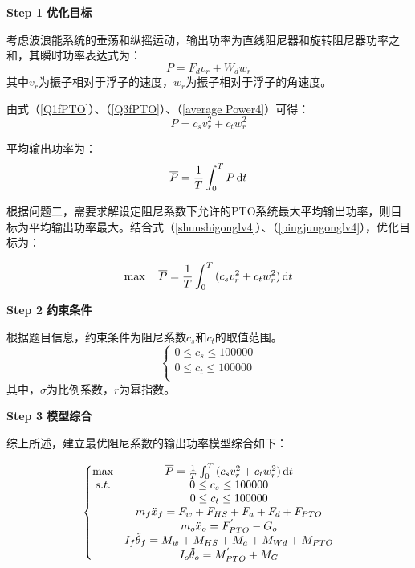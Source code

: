 \documentclass{my_paper}
\begin{document}
\textbf{Step 1 优化目标}

考虑波浪能系统的垂荡和纵摇运动，输出功率为直线阻尼器和旋转阻尼器功率之和，其瞬时功率表达式为\cite{唐友刚2016筏式波浪能发电装置浮体水动力相互作用与能量俘获研究}：
\begin{equation}
    P=F_{d} v_{r} + W_{d} w_{r}\label{average Power4}
\end{equation}
其中$v_{r} $为振子相对于浮子的速度，$w_{r} $为振子相对于浮子的角速度。

由式（\ref{Q1fPTO}）、（\ref{Q3fPTO}）、（\ref{average Power4}）可得：
\begin{equation}
    P=c_{s} v_{r}^2 + c_{t} w_{r}^2 \label{shunshigonglv4}
\end{equation}

平均输出功率为：
\begin{equation}
    \overline{P}=\frac{1}{T}\int_{0}^{T}{P}\,{\rm d}t\label{pingjungonglv4}
\end{equation}

根据问题二，需要求解设定阻尼系数下允许的PTO系统最大平均输出功率，则目标为平均输出功率最大。结合式（\ref{shunshigonglv4}）、（\ref{pingjungonglv4}），优化目标为：

$$
\max \quad \overline{P}=\frac{1}{T}\int_{0}^{T}{(c_{s} v_{r}^2 + c_{t} w_{r}^2)}\,{\rm d}t
$$

\textbf{Step 2 约束条件}

根据题目信息，约束条件为阻尼系数$c_s$和$c_t$的取值范围。
        \begin{equation}
            \left\{\begin{matrix}
            0\leq c_{s}\leq 100000 \\
            0\leq c_{t}\leq 100000 \\
            
            \end{matrix}\right.
        \end{equation}
        其中，$\sigma$为比例系数，$r$为幂指数。
    

\textbf{Step 3 模型综合}

综上所述，建立最优阻尼系数的输出功率模型综合如下：

\begin{equation}
    \left\{\begin{matrix}
        \max & \overline{P}=\frac{1}{T}\int_{0}^{T}{(c_{s} v_{r}^2 + c_{t} w_{r}^2)}\,{\rm d}t\\
        s.t. & 0 \leq c_s\leq 100000 \\
            & 0 \leq c_t\leq 100000 \\
            &  m_f \ddot x_f = F_w+F_{HS}+F_a+F_d+F_{PTO}\\
            &  m_o\ddot x_o = F_{PTO}^{'}-G_o\\
            & I_{f} \ddot \theta_{f} = M_w+M_{HS}+M_a+M_{Wd}+M_{PTO}\\
            & I_{o} \ddot \theta_{o} = M_{PTO}^{'}+M_{G}
    \end{matrix}
    \right.
\end{equation}
        
\end{document}
